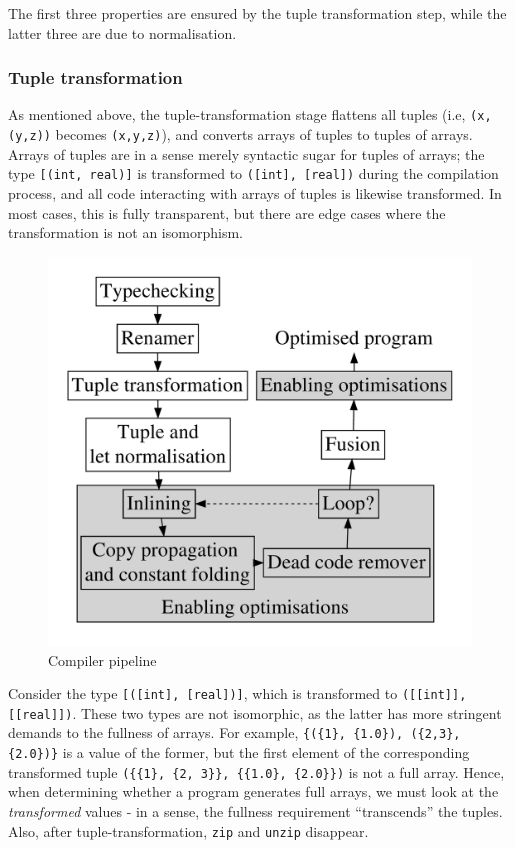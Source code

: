 \documentclass{sigplanconf}  %
\begin{document}
The first three properties are ensured by the tuple transformation
step, while the latter three are due to normalisation.

\subsubsection{Tuple transformation}
\label{sec:tuple-transformation}

As mentioned above, the tuple-transformation stage flattens all tuples
(i.e, {\tt (x,(y,z))} becomes {\tt (x,y,z)}), and converts arrays of
tuples to tuples of arrays.  Arrays of tuples are in a sense merely
syntactic sugar for tuples of arrays; the type {\tt [(int, real)]} is
transformed to {\tt ([int], [real])} during the compilation process,
and all code interacting with arrays of tuples is likewise
transformed.  In most cases, this is fully transparent, but there are
edge cases where the transformation is not an isomorphism.

\begin{figure}[bt]
\begin{center}
\includegraphics[width=0.7\columnwidth]{Figures/pipeline}
\end{center}
\caption{Compiler pipeline}
\label{fig:l0cpipeline}
\end{figure}

Consider the type {\tt [([int], [real])]}, which is transformed to
{\tt([[int]], [[real]])}.  These two types are not isomorphic, as the
latter has more stringent demands to the fullness of arrays.  For
example, {\tt\{(\{1\}, \{1.0\}), (\{2,3\}, \{2.0\})\}} is a value of
the former, but the first element of the corresponding transformed
tuple {\tt(\{\{1\}, \{2, 3\}\}, \{\{1.0\}, \{2.0\}\})} is not a full
array.  Hence, when determining whether a program generates full
arrays, we must look at the \textit{transformed} values - in a sense,
the fullness requirement ``transcends'' the tuples.  Also, after
tuple-transformation, {\tt zip} and {\tt unzip} disappear.
\end{document}
